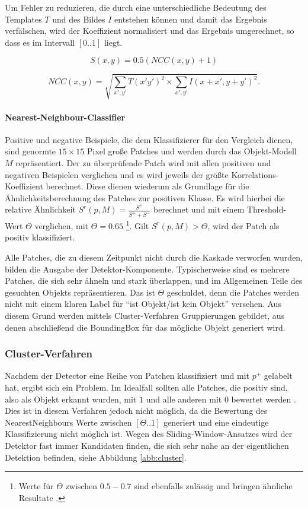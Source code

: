 	Um Fehler zu reduzieren, die durch eine unterschiedliche Bedeutung des Templates $T$ und des Bildes $I$ entstehen können und damit das Ergebnis verfälschen, wird der Koeffizient normalisiert und das Ergebnis umgerechnet, so dass es im Intervall $[0..1]$ liegt.

	\begin{equation}
	S(x,y)=0.5(NCC(x,y)+1)
	\end{equation}

	\begin{equation}
	NCC(x,y)=\sqrt{\underset{x',y'}{\sum}T(x'y')^{2}\times\underset{x',y'}{\sum}I(x+x',y+y')^{2}}.
	\end{equation}

	\paragraph{Nearest-Neighbour-Classifier}
	Positive und negative Beispiele, die dem Klassifizierer für den Vergleich dienen, sind genormte $15\times15$ Pixel große Patches und werden	durch das Objekt-Modell $M$ repräsentiert. Der zu überprüfende Patch wird mit allen positiven und negativen Beispielen verglichen und es wird jeweils der größte Korrelations-Koeffizient berechnet. Diese dienen wiederum als Grundlage für die Ähnlichkeitsberechnung des Patches zur positiven Klasse. Es wird hierbei die relative Ähnlichkeit $S^{r}(p,M)=\frac{S^{+}}{S^{+}+S^{-}}$	berechnet und mit einem Threshold-Wert $\Theta$ verglichen, mit $\Theta=0.65$	\footnote{Werte für $\Theta$ zwischen $0.5-0.7$ sind ebenfalls zulässig und	bringen ähnliche Resultate \cite{TLD}. }. Gilt $S^{r}(p,M)>\Theta$, wird der Patch als positiv klassifiziert.

	Alle Patches, die zu diesem Zeitpunkt nicht durch die Kaskade verworfen wurden, bilden die Ausgabe der Detektor-Komponente. Typischerweise sind es mehrere Patches, die sich sehr ähneln und stark überlappen, und im Allgemeinen Teile des gesuchten Objekts repräsentieren. Das ist $\Theta$ geschuldet, denn die Patches werden nicht mit einem klaren Label für ``ist Objekt/ist kein Objekt'' versehen. Aus diesem Grund werden mittels Cluster-Verfahren Gruppierungen gebildet, aus denen abschließend die BoundingBox für das mögliche Objekt generiert wird.


	\subsubsection{Cluster-Verfahren}
	Nachdem der Detector eine Reihe von Patchen klassifiziert und mit	$p^{+}$ gelabelt hat, ergibt sich ein Problem. Im Idealfall sollten	alle Patches, die positiv sind, also als Objekt erkannt wurden, mit $1$ und alle anderen mit $0$ bewertet werden \cite{BAB}. Dies ist in diesem Verfahren jedoch nicht möglich, da die Bewertung des NearestNeighbours	Werte zwischen $[\Theta..1]$ generiert und eine eindeutige Klassifizierung nicht möglich ist. Wegen des Sliding-Window-Ansatzes wird der Detektor	fast immer Kandidaten finden, die sich sehr nahe an der eigentlichen Detektion befinden, siehe Abbildung \ref{abb:cluster}.

